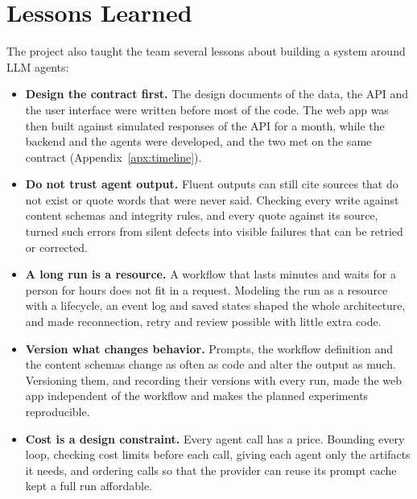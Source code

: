 \section{Lessons Learned}
\label{sec:conc-lessons}
The project also taught the team several lessons about building a system around LLM agents:
\begin{itemize}
    \item \textbf{Design the contract first.} The design documents of the data, the API and the user interface were written before most of the code. The web app was then built against simulated responses of the API for a month, while the backend and the agents were developed, and the two met on the same contract (Appendix~\ref{apx:timeline}).
    \item \textbf{Do not trust agent output.} Fluent outputs can still cite sources that do not exist or quote words that were never said. Checking every write against content schemas and integrity rules, and every quote against its source, turned such errors from silent defects into visible failures that can be retried or corrected.
    \item \textbf{A long run is a resource.} A workflow that lasts minutes and waits for a person for hours does not fit in a request. Modeling the run as a resource with a lifecycle, an event log and saved states shaped the whole architecture, and made reconnection, retry and review possible with little extra code.
    \item \textbf{Version what changes behavior.} Prompts, the workflow definition and the content schemas change as often as code and alter the output as much. Versioning them, and recording their versions with every run, made the web app independent of the workflow and makes the planned experiments reproducible.
    \item \textbf{Cost is a design constraint.} Every agent call has a price. Bounding every loop, checking cost limits before each call, giving each agent only the artifacts it needs, and ordering calls so that the provider can reuse its prompt cache kept a full run affordable.
\end{itemize}
